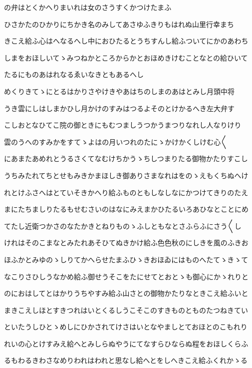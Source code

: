 \documentclass[a4paper,11pt,landscape]{ltjtarticle}
\begin{document}
\par\medskip
の弁はとくかへりまいれは女のさうすくかつけたまふ
\par\medskip
ひさかたのひかりにちかき名のみしてあさゆふきりもはれぬ山里行幸まち
\par\medskip
きこえ給ふ心はへなるへし中におひたるとうちすんし給ふついてにかのあわち
\par\medskip
しまをおほしいてゝみつねかところからかとおほめきけむことなとの給ひいて
\par\medskip
たるにものあはれなるゑいなきともあるへし
\par\medskip
めくりきてゝにとるはかりさやけきやあはちのしまのあはとみし月頭中将
\par\medskip
うき雲にしはしまかひし月かけのすみはつるよそのとけかるへき左大弁す
\par\medskip
こしおとなひてこ院の御ときにもむつましうつかうまつりなれし人なりけり
\par\medskip
雲のうへのすみかをすてゝよはの月いつれのたにゝかけかくしけむ心〱
\par\medskip
にあまたあめれとうるさくてなむけちかうゝちしつまりたる御物かたりすこし
\par\medskip
うちみたれてちとせもみきかまほしき御ありさまなれはをのゝえもくちぬへけ
\par\medskip
れとけふさへはとていそきかへり給ふものともしなしなにかつけてきりのたえ
\par\medskip
まにたちましりたるもせむさいのはなにみえまかひたるいろあひなとことにめ
\par\medskip
てたし近衛つかさのなたかきとねりものゝふしともなとさふらふにさう〱し
\par\medskip
けれはそのこまなとみたれあそひてぬきかけ給ふ色色秋のにしきを風のふきお
\par\medskip
ほふかとみゆのゝしりてかへらせたまふひゝきおほゐにはものへたてゝきゝて
\par\medskip
なこりさひしうなかめ給ふ御せうそこをたにせてとおとゝも御心にかゝれりと
\par\medskip
のにおはしてとはかりうちやすみ給ふ山さとの御物かたりなときこえ給ふいと
\par\medskip
まきこえしほとすきつれはいとくるしうこそこのすきものとものたつねきてい
\par\medskip
といたうしひとゝめしにひかされてけさはいとなやましとておほとのこもれり
\par\medskip
れいの心とけすみえ給へとみしらぬやうにてなすらひならぬ程をおほしくらふ
\par\medskip
るもわるきわさなめりわれはわれと思なし給へとをしへきこえ給ふくれかゝる
\end{document}
